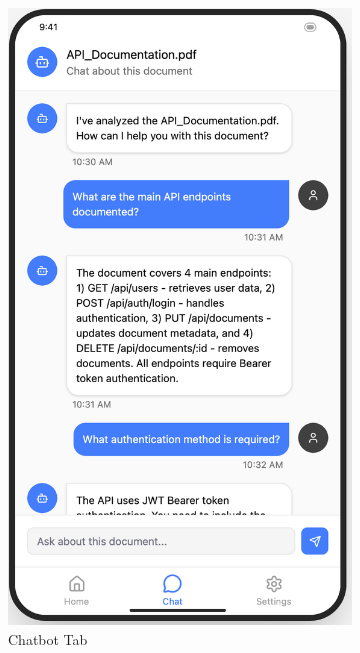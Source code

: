 \documentclass[12pt]{article}
\begin{document}
\begin{figure}
\begin{subfigure}{0.3\textwidth}
                \includegraphics[width=\textwidth]{img/FrontendChatTab.png}
                \caption{Chatbot Tab}
                \label{fig:ChatbotTab}
            \end{subfigure}
            \hfill
            \begin{subfigure}{0.3\textwidth}

\end{subfigure}
\end{figure}
\end{document}
